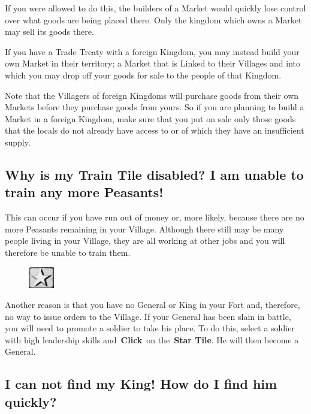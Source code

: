 If you were allowed to do this, the builders of a Market would quickly lose control over what goods are being placed there. Only the kingdom which owns a Market may sell its goods there.

If you have a Trade Treaty with a foreign Kingdom, you may instead build your own Market in their territory; a Market that is Linked to their Villages and into which you may drop off your goods for sale to the people of that Kingdom.

Note that the Villagers of foreign Kingdoms will purchase goods from their own Markets before they purchase goods from yours. So if you are planning to build a Market in a foreign Kingdom, make sure that you put on sale only those goods that the locals do not already have access to or of which they have an insufficient supply.

\subsection{Why is my Train Tile disabled? I am unable to train any more Peasants!}

This can occur if you have run out of money or, more likely, because there are no more Peasants remaining in your Village. Although there still may be many people living in your Village, they are all working at other jobs and you will therefore be unable to train them.

\begin{figure}
	\vspace{-20pt}
	\begin{center}
		\includegraphics[width=0.1\textwidth]{Tstar}
	\end{center}
	\vspace{-20pt}
\end{figure}

Another reason is that you have no General or King in your Fort and, therefore, no way to issue orders to the Village. If your General has been slain in battle, you will need to promote a soldier to take his place. To do this, select a soldier with high leadership skills and \textbf{Click} on the \textbf{Star Tile}. He will then become a General.

\subsection{I can not find my King! How do I find him quickly?}

